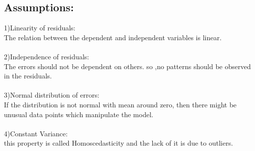 \documentclass{article}
\begin{document}
\subsection{Assumptions:}
 1)Linearity of residuals:\\
 The relation between the dependent and independent variables is linear.\\\\
 2)Independence of residuals:\\
 The errors should not be dependent on others. so ,no patterns should be observed in the residuals.\\\\
 3)Normal distribution of errors:\\
 If the distribution is not normal with mean around zero, then there might be unusual data points which manipulate the model.\\\\
 4)Constant Variance:
 \\this property is called  Homoscedasticity and the lack of it is due to outliers.\\\\
 
 
\end{document}
